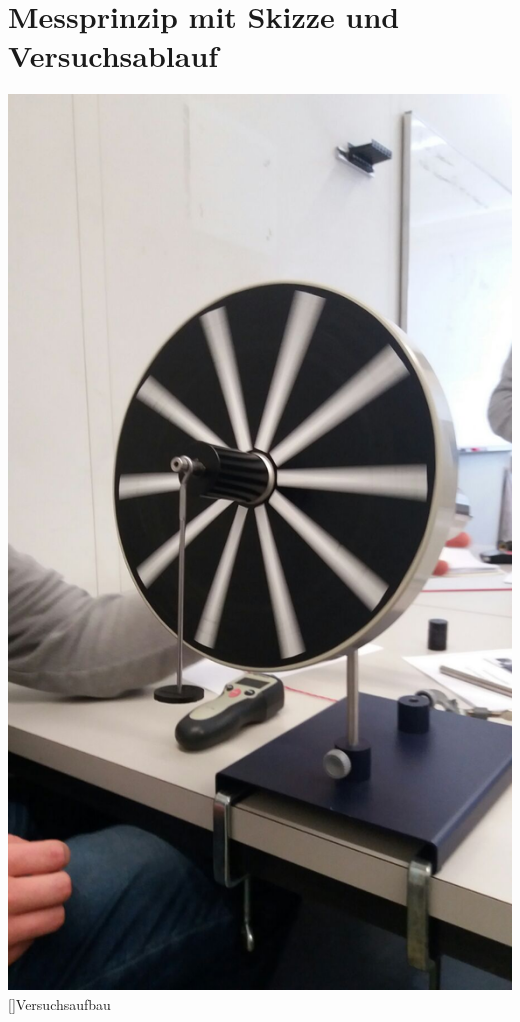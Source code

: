\documentclass[12pt,a4paper,]{scrreprt}
\begin{document}
 	\pagebreak
 




\chapter{Messprinzip mit Skizze und Versuchsablauf}
   \begin{center}
    	\includegraphics[scale=0.25]{aufbau.jpg}
        []{Versuchsaufbau}
   \end{center}
\end{document}
